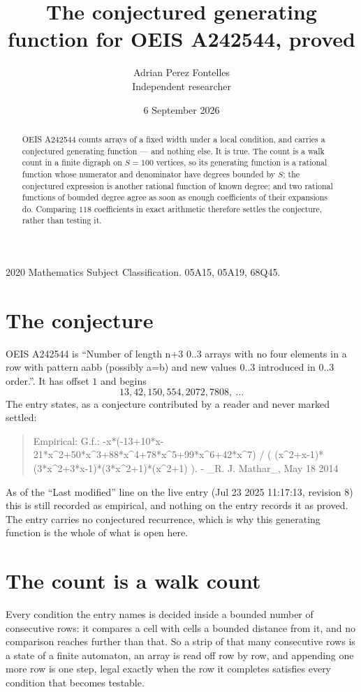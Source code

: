 \documentclass[11pt,a4paper]{article}
\title{The conjectured generating function for OEIS A242544, proved}
\author{Adrian Perez Fontelles\\ \small Independent researcher}
\date{6 September 2026}
\theoremstyle{plain}
\theoremstyle{definition}
\begin{document}
\maketitle

\begin{abstract}
OEIS A242544 counts arrays of a fixed width under a local condition, and carries a conjectured
generating function --- and nothing else. It is true. The count is a walk count in a finite
digraph on $S=100$ vertices, so its generating function is a rational function whose numerator
and denominator have degrees bounded by $S$; the conjectured expression is another rational
function of known degree; and two rational functions of bounded degree agree as soon as enough
coefficients of their expansions do. Comparing $118$ coefficients in exact arithmetic
therefore settles the conjecture, rather than testing it.
\end{abstract}

\noindent\small 2020 Mathematics Subject Classification. 05A15, 05A19, 68Q45.\normalsize

\section{The conjecture}

OEIS A242544 is ``Number of length n+3 0..3 arrays with no four elements in a row with pattern aabb (possibly a=b) and new values 0..3 introduced in 0..3 order.''. It has offset $1$ and begins
\[
13, 42, 150, 554, 2072, 7808,\ \dots
\]
The entry states, as a conjecture contributed by a reader and never marked settled:
\begin{quote}
Empirical: G.f.: -x*(-13+10*x-21*x\^{}2+50*x\^{}3+88*x\^{}4+78*x\^{}5+99*x\^{}6+42*x\^{}7) / ( (x\^{}2+x-1)*(3*x\^{}2+3*x-1)*(3*x\^{}2+1)*(x\^{}2+1) ). - \_R. J. Mathar\_, May 18 2014
\end{quote}
As of the ``Last modified'' line on the live entry (Jul 23 2025 11:17:13, revision 8) this is still
recorded as empirical, and nothing on the entry records it as proved. The entry carries no
conjectured recurrence, which is why this generating function is the whole of what is open
here.

\section{The count is a walk count}

Every condition the entry names is decided inside a bounded number of consecutive rows: it
compares a cell with cells a bounded distance from it, and no comparison reaches further than
that. So a strip of that many consecutive rows is a state of a finite automaton, an array is
read off row by row, and appending one more row is one step, legal exactly when the row it
completes satisfies every condition that becomes testable.
\end{document}
